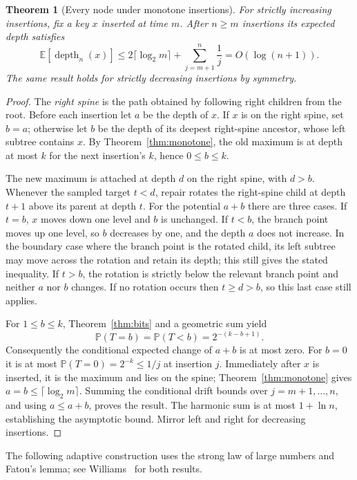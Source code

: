 \documentclass[11pt]{article}
\newtheorem{theorem}{Theorem}
\newcommand{\E}{\mathbb{E}}
\newcommand{\Prb}{\mathbb{P}}
\begin{document}
\begin{theorem}[Every node under monotone insertions]\label{thm:monotone-all}
For strictly increasing insertions, fix a key $x$ inserted at time $m$. After
$n\geq m$ insertions its expected depth satisfies
\[
\E[\operatorname{depth}_n(x)]\leq
2\lceil\log_2 m\rceil+\sum_{j=m+1}^{n}\frac1j=O(\log(n+1)).
\]
The same result holds for strictly decreasing insertions by symmetry.
\end{theorem}
\begin{proof}
The \emph{right spine} is the path obtained by following right children from
the root. Before each insertion let $a$ be the depth of $x$. If $x$ is on the
right spine, set $b=a$; otherwise let $b$ be the depth of its deepest right-spine
ancestor, whose left subtree contains $x$. By Theorem~\ref{thm:monotone}, the
old maximum is at depth at most $k$ for the next insertion's $k$, hence
$0\leq b\leq k$.

The new maximum is attached at depth $d$ on the right spine, with $d>b$.
Whenever the sampled target $t<d$, repair rotates the right-spine child at
depth $t+1$ above its parent at depth $t$. For the potential $a+b$ there are
three cases. If $t=b$, $x$ moves down one level and $b$ is unchanged. If
$t<b$, the branch point moves up one level, so $b$ decreases by one, and the
depth $a$ does not increase. In the boundary case where the branch point is
the rotated child, its left subtree may move across the rotation and retain
its depth; this still gives the stated inequality. If $t>b$, the rotation is
strictly below the relevant branch point and neither $a$ nor $b$ changes.
If no rotation occurs then $t\geq d>b$, so this last case still applies.

For $1\leq b\leq k$, Theorem~\ref{thm:bits} and a geometric sum yield
\[\Prb(T=b)=\Prb(T<b)=2^{-(k-b+1)}.\]
Consequently the conditional expected change of $a+b$ is at most zero.
For $b=0$ it is at most $\Prb(T=0)=2^{-k}\leq1/j$ at insertion $j$.
Immediately after $x$ is inserted, it is the maximum and lies on the spine;
Theorem~\ref{thm:monotone} gives $a=b\leq\lceil\log_2 m\rceil$. Summing the
conditional drift bounds over $j=m+1,\ldots,n$, and using $a\leq a+b$,
proves the result. The harmonic sum is at most $1+\ln n$, establishing the
asymptotic bound. Mirror left and right for decreasing insertions.
\end{proof}

The following adaptive construction uses the strong law of large numbers and
Fatou's lemma; see Williams~\cite{williams} for both results.

\end{document}
